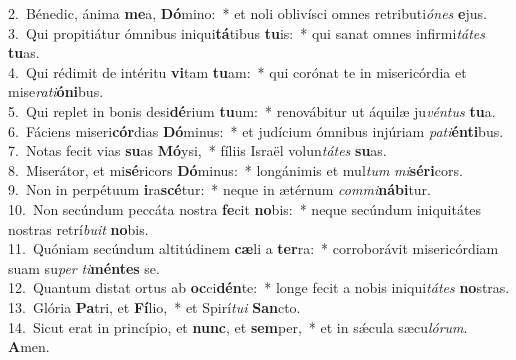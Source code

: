 {2.~}Bénedic, ánima \textbf{me}a, \textbf{Dó}mino:~* et noli oblivísci omnes retributi\textit{ó}\textit{nes} \textbf{e}jus.\\
{3.~}Qui propitiátur ómnibus iniqui\textbf{tá}tibus \textbf{tu}is:~* qui sanat omnes infirmi\textit{tá}\textit{tes} \textbf{tu}as.\\
{4.~}Qui rédimit de intéritu \textbf{vi}tam \textbf{tu}am:~* qui corónat te in misericórdia et mise\textit{ra}\textit{ti}\textbf{ó}\textbf{ni}bus.\\
{5.~}Qui replet in bonis desi\textbf{dé}rium \textbf{tu}um:~* renovábitur ut áquilæ ju\textit{vén}\textit{tus} \textbf{tu}a.\\
{6.~}Fáciens miseri\textbf{cór}dias \textbf{Dó}minus:~* et judícium ómnibus injúriam \textit{pa}\textit{ti}\textbf{én}\textbf{ti}bus.\\
{7.~}Notas fecit vias \textbf{su}as \textbf{Mó}ysi,~* fíliis Israël volun\textit{tá}\textit{tes} \textbf{su}as.\\
{8.~}Miserátor, et mi\textbf{sé}ricors \textbf{Dó}minus:~* longánimis et mul\textit{tum} \textit{mi}\textbf{sé}\textbf{ri}cors.\\
{9.~}Non in perpétuum \textbf{i}ra\textbf{scé}tur:~* neque in ætérnum \textit{com}\textit{mi}\textbf{ná}\textbf{bi}tur.\\
{10.~}Non secúndum peccáta nostra \textbf{fe}cit \textbf{no}bis:~* neque secúndum iniquitátes nostras retrí\textit{bu}\textit{it} \textbf{no}bis.\\
{11.~}Quóniam secúndum altitúdinem \textbf{cæ}li a \textbf{ter}ra:~* corroborávit misericórdiam suam su\textit{per} \textit{ti}\textbf{mén}\textbf{tes} se.\\
{12.~}Quantum distat ortus ab \textbf{oc}ci\textbf{dén}te:~* longe fecit a nobis iniqui\textit{tá}\textit{tes} \textbf{no}stras.\\
{13.~}Glória \textbf{Pa}tri, et \textbf{Fí}lio,~* et Spirí\textit{tu}\textit{i} \textbf{San}cto.\\
{14.~}Sicut erat in princípio, et \textbf{nunc}, et \textbf{sem}per,~* et in sǽcula sæcu\textit{ló}\textit{rum}. \textbf{A}men.\\
